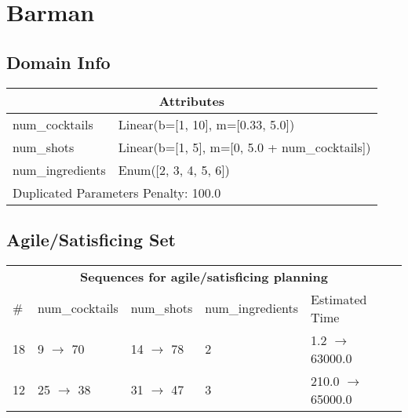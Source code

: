 \documentclass{article}
\begin{document}
        
        \newpage \section{Barman}
                    \subsection*{Domain Info}

                    \begin{center}
                    \begin{tabular}{p{}p{}}
                    \multicolumn{2}{c}{\bf \large Attributes}\\\midrule
                    num\_cocktails & Linear(b=[1, 10], m=[0.33, 5.0])\\
num\_shots & Linear(b=[1, 5], m=[0, 5.0 + num\_cocktails])\\
num\_ingredients & Enum([2, 3, 4, 5, 6])
                    
                     \\\midrule
                    \multicolumn{2}{l}{Duplicated Parameters Penalty: 100.0}
                    \end{tabular}
                    \end{center}
                
                         \subsection*{Agile/Satisficing Set}

                        \begin{center}
                        \begin{tabular}{l|l|l|l|l}
                        \multicolumn{5}{c}{\bf \large Sequences for agile/satisficing planning}\\
                        \# & num\_cocktails & num\_shots & num\_ingredients & Estimated Time\\\midrule
                        18&9 $\rightarrow$ 70&14 $\rightarrow$ 78&2&1.2 $\rightarrow$ 63000.0\\
12&25 $\rightarrow$ 38&31 $\rightarrow$ 47&3&210.0 $\rightarrow$ 65000.0
                        \end{tabular}
                        \end{center}
                    
\end{document}

